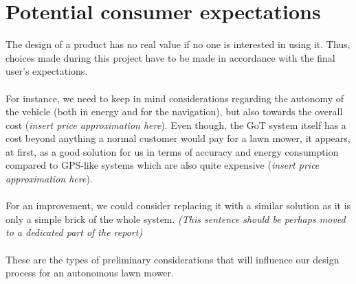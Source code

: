 \section{Potential consumer expectations}
The design of a product has no real value if no one is interested in using it. Thus, choices made during this project have to be made in accordance with the final user's expectations.\\\\
For instance, we need to keep in mind considerations regarding the autonomy of the vehicle (both in energy and for the navigation), but also towards the overall cost (\emph{insert price approximation here}). Even though, the GoT system itself has a cost beyond anything a normal customer would pay for a lawn mower, it appears, at first, as a good solution for us in terms of accuracy and energy consumption compared to GPS-like systems which are also quite expensive (\emph{insert price approximation here}). \\\\
For an improvement, we could consider replacing it with a similar solution as it is only a simple brick of the whole system. \emph{(This sentence should be perhaps moved to a dedicated part of the report)}\\\\
These are the types of preliminary considerations that will influence our design process for an autonomous lawn mower.